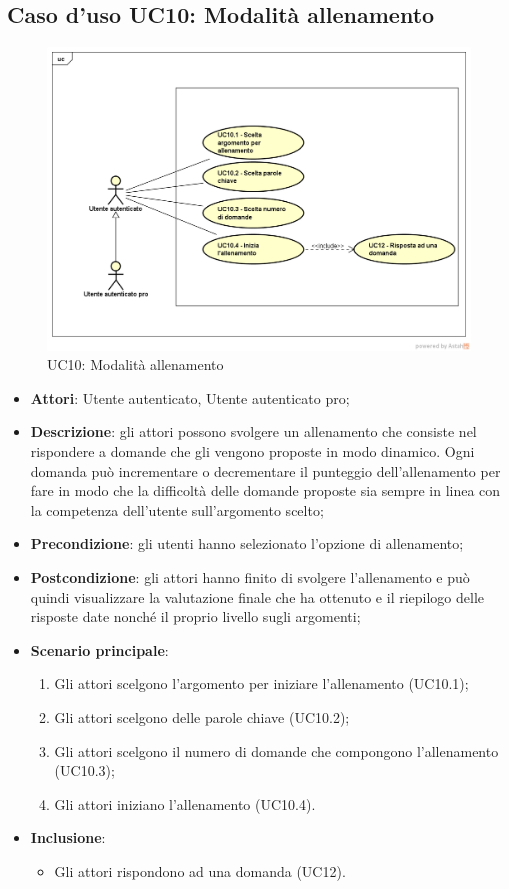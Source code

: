 \subsection{Caso d'uso UC10: Modalità allenamento}
\label{UC10}
	\begin{figure}
	\centering
	\includegraphics[scale=0.5]{UML/UC10.png}
	\caption{UC10: Modalità allenamento}
	\end{figure}
\FloatBarrier
\begin{itemize}
\item\textbf{Attori}: Utente autenticato, Utente autenticato pro;
\item\textbf{Descrizione}: gli attori possono svolgere un allenamento che consiste nel rispondere a domande che gli vengono proposte in modo dinamico. Ogni domanda può incrementare o decrementare il punteggio dell'allenamento per fare in modo che la difficoltà delle domande proposte sia sempre in linea con la competenza dell'utente sull'argomento scelto;
\item\textbf{Precondizione}: gli utenti hanno selezionato l'opzione di allenamento;
\item\textbf{Postcondizione}: gli attori hanno finito di svolgere l'allenamento e può quindi visualizzare la valutazione finale che ha ottenuto e il riepilogo delle risposte date nonché il proprio livello sugli argomenti;
\item\textbf{Scenario principale}:
	\begin{enumerate}
		\item Gli attori scelgono l'argomento per iniziare l'allenamento (UC10.1);
		\item Gli attori scelgono delle parole chiave (UC10.2);
		\item Gli attori scelgono il numero di domande che compongono l'allenamento (UC10.3);
		\item Gli attori iniziano l'allenamento (UC10.4).
	\end{enumerate}
\item \textbf{Inclusione}:
	\begin{itemize}
		\item Gli attori rispondono ad una domanda (UC12).
	\end{itemize}
\end{itemize}

